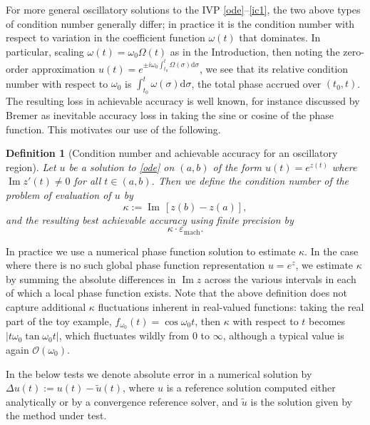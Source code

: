 \documentclass[10pt]{article}
\newcommand{\be}{\begin{equation}}
\newcommand{\ee}{\end{equation}}
\renewcommand{\d}{\mathrm{d}} %
\newcommand{\bigO}{{\mathcal O}}
\newcommand{\veps}{\varepsilon}
\DeclareMathOperator{\im}{Im}
\newtheorem{defn}[thm]{Definition}
\newcommand{\om}{\omega}
\begin{document}
For more general oscillatory solutions to the IVP \eqref{ode}--\eqref{ic1},
the two above types of condition number generally differ;
in practice it is the condition number with respect to
variation in the coefficient function $\om(t)$ that dominates.
In particular, scaling $\om(t)=\om_0 \Omega(t)$ as in the Introduction,
then noting the zero-order approximation
$u(t) = e^{\pm i \om_0 \int_{t_0}^t \Omega(\sigma) \d\sigma}$,
we see that its relative condition number with respect to
$\om_0$ is $\int_{t_0}^t \om(\sigma) \d\sigma$, the total phase
accrued over $(t_0,t)$.
The resulting loss in achievable accuracy is well known,
for instance discussed by Bremer \cite{bremer2018} as
inevitable accuracy loss in taking the sine or cosine of the phase function.
This motivates our use of the following.
\begin{defn}[Condition number and achievable accuracy for an oscillatory region]
  Let $u$ be a solution to \eqref{ode} on $(a,b)$ of the form
  $u(t) = e^{z(t)}$ where $\im z'(t) \neq 0$ for all $t\in(a,b)$.
  Then we define the condition number of the problem of evaluation of $u$
  by
  \be
  \kappa := \im\, [ z(b) - z(a) ],
  \label{conditionnodef}
  \ee
  and the resulting best achievable accuracy using finite precision by
  \be
  \kappa \cdot \veps_{\mathrm{mach}}.   %
  \label{mineps}
  \ee
\end{defn}
In practice we use a numerical phase function solution to estimate $\kappa$.
In the case where there is no such global phase function
representation $u=e^z$, 
we estimate $\kappa$ %
by summing the absolute differences in $\im z$ across
the various intervals in each of which a local phase function exists.
Note that the above definition does not
capture additional $\kappa$ fluctuations inherent in real-valued
functions:
taking the real part of the toy example, $f_{\om_0}(t) = \cos \om_0 t$,
then $\kappa$ with respect to $t$ becomes $|t\om_0 \tan \om_0 t|$,
which fluctuates wildly from $0$ to $\infty$,
although a typical value is again $\bigO(\om_0)$.

In the below tests we denote absolute error in a numerical solution by
$\Delta u(t) := u(t) - \tilde u(t)$, where
$u$ is a reference solution computed either analytically
or by a convergence reference solver,
and $\tilde u$ is the solution given by the method under test.
\end{document}
